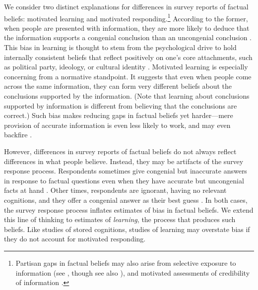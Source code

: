 \documentclass[12pt, letterpaper]{article}
\begin{document}
We consider two distinct explanations for differences in survey reports of factual beliefs: motivated learning and motivated responding.\footnote{Partisan gaps in factual beliefs may also arise from selective exposure to information (see \citealt{stroud2010}, though see also \citealt{prior2013}), and motivated assessments of credibility of information \citep[see, e.g.,][]{lord1979}.} According to the former, when people are presented with information, they are more likely to deduce that the information supports a congenial conclusion than an uncongenial conclusion \citep{jerit2012, kahan2013, kahan2017}. This bias in learning is thought to stem from the psychological drive to hold internally consistent beliefs that reflect positively on one's core attachments, such as political party, ideology, or cultural identity \citep{kunda1990}. Motivated learning is especially concerning from a normative standpoint. It suggests that even when people come across the same information, they can form very different beliefs about the conclusions supported by the information. (Note that learning about conclusions supported by information is different from believing that the conclusions are correct.) Such bias makes reducing gaps in factual beliefs yet harder---mere provision of accurate information is even less likely to work, and may even backfire \citep[see, e.g.,][]{nyhanreifler2010}.

However, differences in survey reports of factual beliefs do not always reflect differences in what people believe. Instead, they may be artifacts of the survey response process. Respondents sometimes give congenial but inaccurate answers in response to factual questions even when they have accurate but uncongenial facts at hand \citep{bullock2015, prior2015}. Other times, respondents are ignorant, having no relevant cognitions, and they offer a congenial answer as their best guess \citep{luskin2013}. In both cases, the survey response process inflates estimates of bias in factual beliefs. We extend this line of thinking to estimates of {\it learning}, the process that produces such beliefs. Like studies of stored cognitions, studies of learning may overstate bias if they do not account for motivated responding. 
\end{document}
